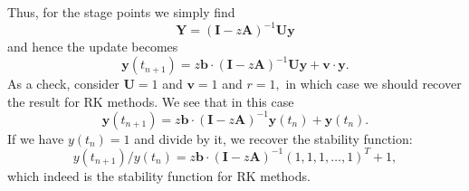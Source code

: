 \documentclass[10pt,a4paper]{article}
\newcommand{\bvec}[1]{\mathbf{#1}}
\begin{document}
Thus, for the stage points we simply find
\begin{equation*}
  \bvec{Y} = (\bvec{I} - z\bvec{A})^{-1}\bvec{Uy}
\end{equation*}
and hence the update becomes
\begin{equation*}
  \bvec{y}(t_{n+1}) = z \bvec{b} \cdot (\bvec{I} - z\bvec{A})^{-1}\bvec{Uy} + \bvec{v}\cdot\bvec{y}.
\end{equation*}
As a check, consider $\bvec{U}=1$ and $\bvec{v} = 1$ and $r=1,$ in which case we should recover the result for RK methods.
We see that in this case
\begin{equation*}
  \bvec{y}(t_{n+1}) = z \bvec{b} \cdot (\bvec{I} - z\bvec{A})^{-1}\bvec{y}(t_n) + \bvec{y}(t_n).
\end{equation*}
If we have $y(t_n) = 1$ and divide by it, we recover the stability function:
\begin{equation*}
  y(t_{n+1})/y(t_n) = z \bvec{b} \cdot (\bvec{I} - z\bvec{A})^{-1}(1,1,1,\hdots,1)^T + 1,
\end{equation*}
which indeed is the stability function for RK methods.
\end{document}
